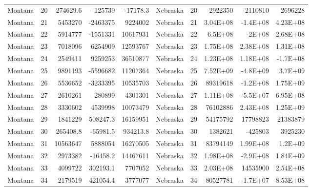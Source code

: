 \begin{landscape}
\begin{singlespace}
\begin{longtable}{lrrrr|lrrrr}
		Montana &  20 & 274629.6 & -125739 & -17178.3 & Nebraska &  20 & 2922350 & -2110810 & 2696228 \\
		Montana &  21 & 5453270 & -2463375 & 9224002 & Nebraska &  21 & 3.04E+08 & -1.4E+08 & 4.23E+08 \\
		Montana &  22 & 5914777 & -1551331 & 10617931 & Nebraska &  22 & 6.5E+08 & -2E+08 & 2.68E+08 \\
		Montana &  23 & 7018096 & 6254909 & 12593767 & Nebraska &  23 & 1.75E+08 & 2.38E+08 & 1.31E+08 \\
		Montana &  24 & 2549411 & 9259253 & 36510877 & Nebraska &  24 & 1.23E+08 & 1.18E+08 & -1.7E+08 \\
		Montana &  25 & 9891193 & -5596682 & 11207364 & Nebraska &  25 & 7.52E+09 & -4.8E+09 & 3.7E+09 \\
		Montana &  26 & 5536652 & -3233395 & 10535703 & Nebraska &  26 & 89319618 & -1.2E+08 & 1.75E+09 \\
		Montana &  27 & 2610261 & -280899 & 4301301 & Nebraska &  27 & 1.11E+08 & -5.5E+07 & 6.95E+08 \\
		Montana &  28 & 3330602 & 4539998 & 10073479 & Nebraska &  28 & 76102886 & 2.43E+08 & 1.25E+09 \\
		Montana &  29 & 1841229 & 508247.3 & 16159951 & Nebraska &  29 & 54175792 & 17798823 & 21383879 \\
		Montana &  30 & 265408.8 & -65981.5 & 934213.8 & Nebraska &  30 & 1382621 & -425803 & 3925230 \\
		Montana &  31 & 10563647 & 5888054 & 16270505 & Nebraska &  31 & 83794149 & 1.99E+08 & 1.2E+09 \\
		Montana &  32 & 2973382 & -16458.2 & 14467611 & Nebraska &  32 & 1.98E+08 & -2.9E+08 & 1.84E+09 \\
		Montana &  33 & 4099722 & 302193.1 & 7707052 & Nebraska &  33 & 2.03E+08 & 14535900 & 2.54E+08 \\
		Montana &  34 & 2179519 & 421054.4 & 3777077 & Nebraska &  34 & 80527781 & -1.7E+07 & 8.53E+08\\


\end{longtable}
\end{singlespace}
\end{landscape}
